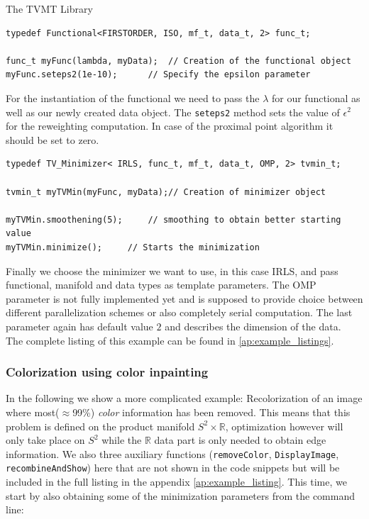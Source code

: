 \begin{chapter}{The TVMT Library}
\cppinline
\begin{lstlisting}[label=code:tut_func,caption={Defining the functional and setting parameters}]
typedef Functional<FIRSTORDER, ISO, mf_t, data_t, 2> func_t;

func_t myFunc(lambda, myData);  // Creation of the functional object
myFunc.seteps2(1e-10);		// Specify the epsilon parameter 
\end{lstlisting}

For the instantiation of the functional we need to pass the $\lambda$ for our functional as well as our newly created data object. The \texttt{seteps2} method
sets the value of $\epsilon^2$ for the reweighting computation. In case of the proximal point algorithm it should be set to zero.\\

\cppinline
\begin{lstlisting}[label=code:tut_data,caption={Choosing the minimizer, smoothing and minimization}]
typedef TV_Minimizer< IRLS, func_t, mf_t, data_t, OMP, 2> tvmin_t;

tvmin_t myTVMin(myFunc, myData);// Creation of minimizer object

myTVMin.smoothening(5);		// smoothing to obtain better starting value
myTVMin.minimize();		// Starts the minimization
\end{lstlisting}

Finally we choose the minimizer we want to use, in this case IRLS, and pass functional, manifold and data types as template parameters. The OMP parameter is not fully implemented yet 
and is supposed to provide choice between different parallelization schemes or also completely serial computation. The last parameter again has default value $2$ and describes the 
dimension of the data.\\
The complete listing of this example can be found in \ref{ap:example_listings}.

\subsubsection{Colorization using color inpainting} %
\label{ssub:Color inpainting}
In the following we show a more complicated example: Recolorization of an image where most($\approx$99\%) \textit{color} information has been removed. This means that this
problem is defined on the product manifold $S^2\times \mathbb{R}$, optimization however will only take place on $S^2$ while the $\mathbb{R}$ data part is only needed to obtain
edge information. We also three auxiliary functions (\texttt{removeColor}, \texttt{DisplayImage}, \texttt{recombineAndShow}) here that are not shown in the code snippets but
will be included in the full listing in the appendix \ref{ap:example_listing}. This time, we start by also obtaining some of the minimization parameters from the command line:\\


\end{chapter}
